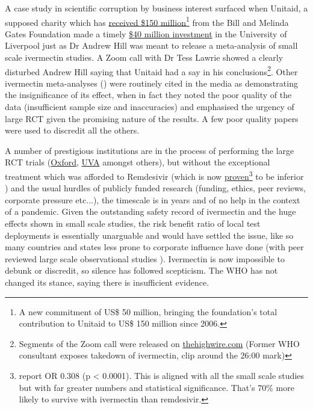 \documentclass[11pt,a4paper,notitlepage]{report}
\begin{document}
A case study in scientific corruption by business interest surfaced when Unitaid, a supposed charity which has \href{https://unitaid.org/news-blog/unitaid-hails-new-us-50-million-contribution-bill-melinda-gates-foundation}{received \$150 million}\footnote{A new commitment of US\$ 50 million, bringing the foundation’s total contribution to Unitaid to US\$ 150 million since 2006.} from the Bill and Melinda Gates Foundation \cite{unitaid122017} made a timely \href{https://unitaid.org/news-blog/unitaid-funding-sees-launch-of-worlds-first-long-acting-medicines-centre-at-university-of-liverpool}{\$40 million investment} in the University of Liverpool \cite{unitaid012021} just as Dr Andrew Hill was meant to release a meta-analysis of small scale ivermectin studies. A Zoom call with Dr Tess Lawrie showed a clearly disturbed Andrew Hill saying that Unitaid had a say in his conclusions\footnote{Segments of the Zoom call were released on \href{https://thehighwire.com/videos/former-w-h-o-consultant-exposes-takedown-of-ivermectin/}{thehighwire.com} (Former WHO consultant exposes takedown of ivermectin, clip around the 26:00 mark)}. Other ivermectin meta-analyses (\cite{Popp21}) were routinely cited in the media as demonstrating the insignificance of its effect, when in fact they noted the poor quality of the data (insufficient sample size and inaccuracies) and emphasised the urgency of large RCT given the promising nature of the results. A few poor quality papers were used to discredit all the others. 

A number of prestigious institutions are in the process of performing the large RCT trials (\href{https://www.principletrial.org/news/ivermectin-to-be-investigated-as-a-possible-treatment-for-covid-19-in-oxford2019s-principle-trial}{Oxford}, \href{https://news.virginia.edu/content/uva-health-joins-national-trial-testing-medications-mild-moderate-covid-19}{UVA} amongst others), but without the exceptional treatment which was afforded to Remdesivir (which is now \href{https://www.sciencedirect.com/science/article/pii/S1201971221009887}{proven}\footnote{\citet{EFIMENKO2022S40} report OR 0.308 (p < 0.0001). This is aligned with all the small scale studies but with far greater numbers and statistical significance. That's 70\% more likely to survive with ivermectin than remdesivir.} to be inferior \cite{EFIMENKO2022S40}) and the usual hurdles of publicly funded research (funding, ethics, peer reviews, corporate pressure etc...), the timescale is in years and of no help in the context of a pandemic. Given the outstanding safety record of ivermectin and the huge effects shown in small scale studies, the risk benefit ratio of local test deployments is essentially unarguable and would have settled the issue, like so many countries and states less prone to corporate influence have done (with peer reviewed large scale observational studies \cite{Kerr2022-ps}). Ivermectin is now impossible to debunk or discredit, so silence has followed scepticism. The WHO has not changed its stance, saying there is insufficient evidence.
\end{document}
